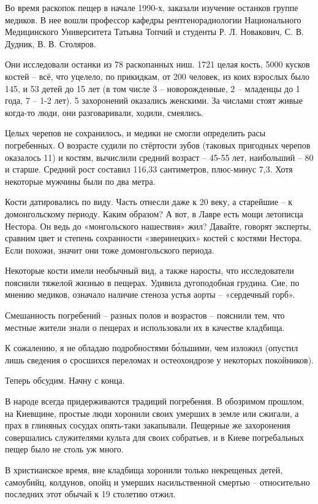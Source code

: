 Во время раскопок пещер в начале 1990-х, заказали изучение останков группе медиков. В нее вошли профессор кафедры рентгенорадиологии Национального Медицинского Университета Татьяна Топчий и студенты Р. Л. Новакович, С. В. Дудник, В. В. Столяров.

Они исследовали останки из 78 раскопанных ниш. 1721 целая кость, 5000 кусков костей – всё, что уцелело, по прикидкам, от 200 человек, из коих взрослых было 145, и 53 детей до 15 лет (в том числе 3 – новорожденные, 2 – младенцы до 1 года, 7 – 1-2 лет). 5 захоронений оказались женскими. За числами стоят живые когда-то люди, они разговаривали, ходили, смеялись.

Целых черепов не сохранилось, и медики не смогли определить расы погребенных. О возрасте судили по стёртости зубов (таковых пригодных черепов оказалось 11) и костям, вычислили средний возраст – 45-55 лет, наибольший – 80 и старше. Средний рост составил 116,33 сантиметров, плюс-минус 7,3. Хотя некоторые мужчины были по два метра.

Кости датировались по виду. Часть отнесли даже к 20 веку, а старейшие – к домонгольскому периоду. Каким образом? А вот, в Лавре есть мощи летописца Нестора. Он ведь до «монгольского нашествия» жил? Давайте, говорят эксперты, сравним цвет и степень сохранности «зверинецких» костей с костями Нестора. Если похожи, значит они тоже домонгольского периода.

Некоторые кости имели необычный вид, а также наросты, что исследователи пояснили тяжелой жизнью в пещерах. Удивила дугоподобная грудина. Сие, по мнению медиков, означало наличие стеноза устья аорты – «сердечный горб».

Смешанность погребений – разных полов и возрастов – пояснили тем, что местные жители знали о пещерах и использовали их в качестве кладбища.

К сожалению, я не обладаю подробностями б\'ольшими, чем изложил (опустил лишь сведения о сросшихся переломах и остеохондрозе у некоторых покойников).

Теперь обсудим. Начну с конца. 

В народе всегда придерживаются традиций погребения. В обозримом прошлом, на Киевщине, простые люди хоронили своих умерших в земле или сжигали, а прах в глиняных сосудах опять-таки закапывали. Пещерные же захоронения совершались служителями культа для своих собратьев, и в Киеве погребальных пещер было не столь уж много.

В христианское время, вне кладбища хоронили только некрещеных детей, самоубийц, колдунов, опойц и умерших насильственной смертью – относительно последних этот обычай к 19 столетию отжил.

